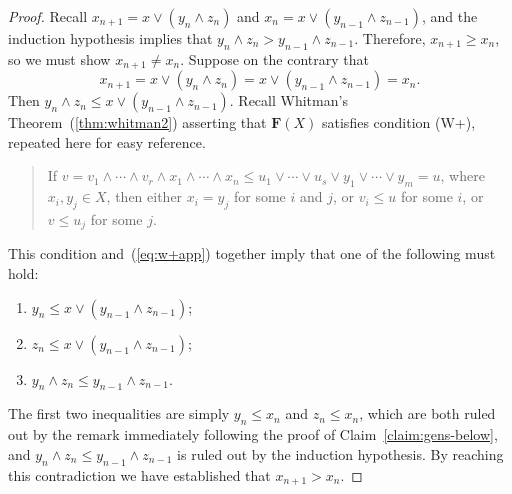 \begin{proof}
Recall $x_{n+1} = x \vee (y_n \wedge z_n)$ and 
$x_{n} = x \vee (y_{n-1} \wedge z_{n-1})$, and 
the induction hypothesis implies that $y_n \wedge z_n > y_{n-1} \wedge z_{n-1}$.
Therefore, 
$x_{n+1} \geq x_{n}$, so we must show $x_{n+1} \neq x_{n}$.  
Suppose on the contrary that 
\begin{equation}\label{eq:w+app}
x_{n+1} = x \vee (y_n \wedge z_n) = x \vee (y_{n-1} \wedge z_{n-1}) = x_n.
\end{equation}
Then $y_n \wedge z_n \leq x \vee (y_{n-1} \wedge z_{n-1})$.  
Recall Whitman's Theorem~(\ref{thm:whitman2}) asserting that 
$\mathbf{F}(X)$ satisfies condition (W+), repeated here for easy reference.
\begin{quote}  
  If $v = v_1 \wedge \cdots \wedge v_r \wedge x_1 \wedge \cdots
  \wedge x_n \leqslant u_1 \vee \cdots \vee u_s \vee
  y_1 \vee \cdots \vee y_m = u$, where $x_i, y_j\in X$, then either 
  $x_i = y_j$ for some $i$ and $j$, or $v_i \leqslant u$ for some $i$, or
  $v \leqslant u_j$ for some $j$. 
\end{quote}  
This condition and~(\ref{eq:w+app}) together imply that one of the following must hold:
\begin{enumerate}
\item $y_n \leq x \vee (y_{n-1} \wedge z_{n-1})$;
\item $z_n \leq x \vee (y_{n-1} \wedge z_{n-1})$;
\item $y_n \wedge z_n \leq y_{n-1} \wedge z_{n-1}$.  
\end{enumerate}
The first two inequalities are simply $y_n \leq x_n$ and $z_n \leq x_n$,
which are both ruled out by the remark immediately following the proof of Claim~\ref{claim:gens-below},
and $y_n \wedge z_n \leq y_{n-1} \wedge z_{n-1}$ is ruled out by the induction hypothesis.
By reaching this contradiction we have established that $x_{n+1} > x_n$.  


\end{proof}
